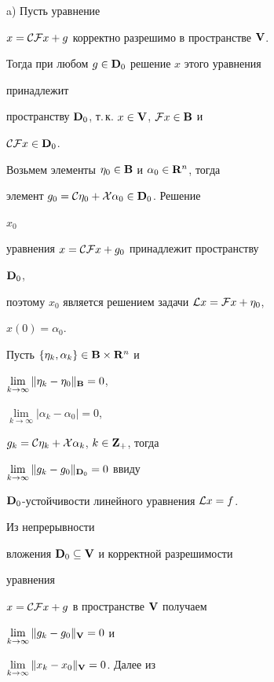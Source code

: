 \begin{pf}


a) Пусть уравнение


$x={\cal C}{\cal F}x+g$ корректно разрешимо в пространстве $\bold {V}$.


Тогда при любом $g\in\bold {D}_0$ решение $x$ этого уравнения


принадлежит


пространству $\spc{D}_0$, т.\,к. $x\in\spc{V}$, ${\cal


F}x\in\spc{B}$ и


${\cal C}{\cal F}x\in\bold {D}_0$.





Возьмем элементы $\eta_0\in\bold {B}$ и $\alpha_0\in\bold {R}^n$, тогда


элемент $g_0={\cal C}\eta_0+{\cal X}\alpha_0\in\bold {D}_0$. Решение


$x_0$


уравнения $x={\cal C}{\cal F}x+g_0$ принадлежит пространству


$\bold {D}_0$,


поэтому $x_0$ является решением задачи ${\cal L}x={\cal F}x+\eta_0$,


$x(0)=\alpha_0$.





Пусть $\{\eta_k,\alpha_k\}\in\bold {B}\times\bold {R}^n$ и


$\lim\limits_{k\to\infty}\|\eta_k-\eta_0\|_{\bold B}=0$,


$\lim\limits_{k\to\infty}|\alpha_k-\alpha_0|=0$,


$g_k={\cal C}\eta_k+{\cal X}\alpha_k$, $k\in\bold {Z}_+$, тогда


$\lim\limits_{k\to\infty}\|g_k-g_0\|_{\bold{D}_0}=0$ ввиду


$\bold {D}_0$-устойчивости линейного уравнения ${\cal L}x=f$.





Из непрерывности


вложения $\bold {D}_0\subseteq\bold {V}$ и корректной разрешимости


уравнения


$x={\cal C}{\cal F}x+g$ в пространстве $\bold {V}$ получаем


$\lim\limits_{k\to\infty}\|g_k-g_0\|_{\bold V}=0$ и


$\lim\limits_{k\to\infty}\|x_k-x_0\|_{\bold V}=0$. Далее из



\end{pf}
